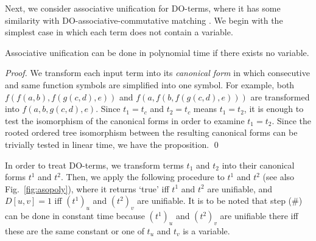 \documentclass[a4paper]{llncs}
\begin{document}
Next, we consider associative unification for DO-terms,
where it has some similarity with DO-associative-commutative matching
\cite{benanav87}.
We begin with the simplest case in which each term does not
contain a variable.

\begin{proposition}
Associative unification can be done in polynomial time if
there exists no variable.
\end{proposition}
\begin{proof}
We transform each input term into its \emph{canonical form} in which 
consecutive and same function symbols are simplified into one symbol.
For example, both $f(f(a,b),f(g(c,d),e))$ and $f(a,f(b,f(g(c,d),e)))$
are transformed into $f(a,b,g(c,d),e)$.
Since $t_1 = t_c$ and $t_2 = t_c$ means $t_1 = t_2$,
it is enough to test the isomorphism of the canonical forms in order to
examine $t_1 = t_2$.
Since the rooted ordered tree isomorphism between the resulting
canonical forms can be trivially tested in linear time,
we have the proposition.
\qed
\end{proof}

In order to treat DO-terms,
we transform terms $t_1$ and $t_2$ into their canonical forms $t^1$ and $t^2$.
Then, we apply the following procedure to $t^1$ and $t^2$
(see also Fig.~\ref{fig:asopoly}),
where it returns `true' iff $t^1$ and $t^2$ are unifiable, and
$D[u,v]=1$ iff $(t^1)_u$ and $(t^2)_v$ are unifiable.
It is to be noted that step (\#) can be done in constant time because
$(t^1)_u$ and $(t^2)_v$ are unifiable there iff
these are the same constant or one of $t_u$ and $t_v$ is a variable.
\end{document}
